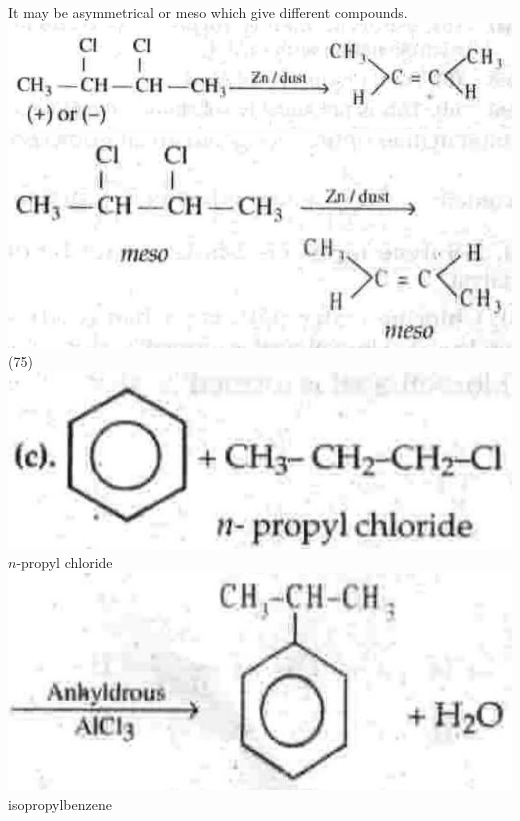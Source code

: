 \documentclass[10pt]{article}
\begin{document}
It may be asymmetrical or meso which give different compounds.\\
\includegraphics[max width=\textwidth, center]{2025_01_28_8470952b98110cec3aabg-244(10)}\\
\includegraphics[max width=\textwidth, center]{2025_01_28_8470952b98110cec3aabg-244(5)}\\
(75)\\
\includegraphics[max width=\textwidth, center]{2025_01_28_8470952b98110cec3aabg-244(4)}\\
$n$-propyl chloride\\
\includegraphics[max width=\textwidth, center]{2025_01_28_8470952b98110cec3aabg-244(6)}\\
isopropylbenzene
\end{document}
